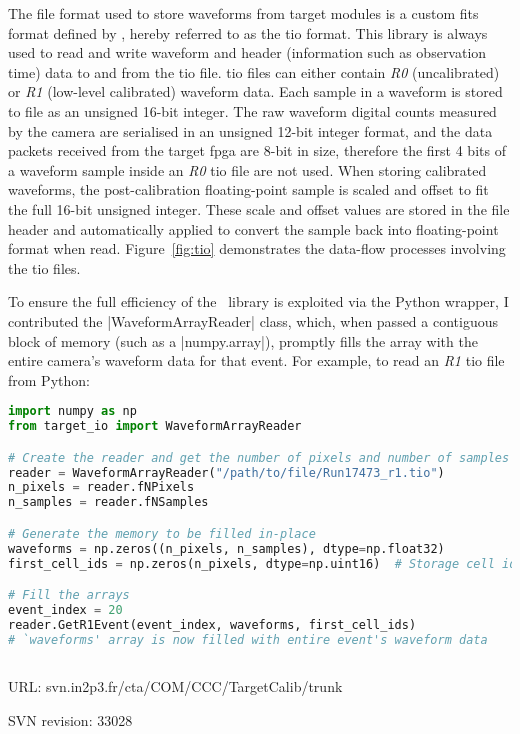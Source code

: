 \noindent The file format used to store waveforms from \gls{target} modules is a custom \gls{fits} format defined by , hereby referred to as the \gls{tio} format. This library is always used to read and write waveform and header (information such as observation time) data to and from the \gls{tio} file. \gls{tio} files can either contain \textit{R0} (uncalibrated)  or \textit{R1} (low-level calibrated) waveform data. Each sample in a waveform is stored to file as an unsigned 16-bit integer. The raw waveform digital counts measured by the camera are serialised in an unsigned 12-bit integer format, and the data packets received from the \gls{target} \gls{fpga} are 8-bit in size, therefore the first 4 bits of a waveform sample inside an \textit{R0} \gls{tio} file are not used. When storing calibrated waveforms, the post-calibration floating-point sample is scaled and offset to fit the full 16-bit unsigned integer. These scale and offset values are stored in the file header and automatically applied to convert the sample back into floating-point format when read. Figure~\ref{fig:tio} demonstrates the data-flow processes involving the \gls{tio} files.

To ensure the full efficiency of the \cpp~library is exploited via the Python wrapper, I contributed the |WaveformArrayReader| class, which, when passed a contiguous block of memory (such as a \lstset{language=Python}|numpy.array|), promptly fills the array with the entire camera's waveform data for that event. For example, to read an \textit{R1} \gls{tio} file from Python:

\begin{lstlisting}[language=Python]
import numpy as np
from target_io import WaveformArrayReader

# Create the reader and get the number of pixels and number of samples from the header
reader = WaveformArrayReader("/path/to/file/Run17473_r1.tio")
n_pixels = reader.fNPixels
n_samples = reader.fNSamples

# Generate the memory to be filled in-place
waveforms = np.zeros((n_pixels, n_samples), dtype=np.float32)
first_cell_ids = np.zeros(n_pixels, dtype=np.uint16)  # Storage cell id for the first sample of the event per pixel

# Fill the arrays
event_index = 20
reader.GetR1Event(event_index, waveforms, first_cell_ids)
# `waveforms' array is now filled with entire event's waveform data
\end{lstlisting}

\subsection{}
\vspace{-0.7em}
\noindent \hspace{\parindent} {\tiny URL: svn.in2p3.fr/cta/COM/CCC/TargetCalib/trunk \par}
\noindent \hspace{\parindent} {\tiny SVN revision: 33028 \par}

